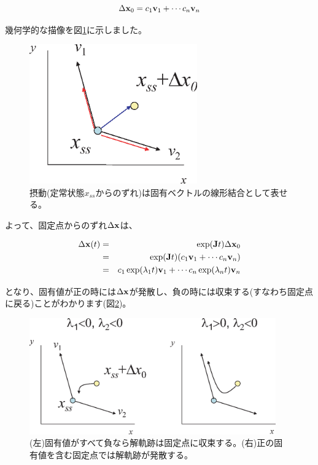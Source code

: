 \[\Delta {\bf x}_0 = c_1 {\bf v}_1 + \cdots c_n {\bf v}_n \]

幾何学的な描像を図\ref{fig:06sysbio}に示しました。

\begin{figure}[ht]
        \centering \includegraphics[height=6cm]{../Bifurcation/img/decomposition.eps}
        \caption{摂動(定常状態\(x_{ss}\)からのずれ)は固有ベクトルの線形結合として表せる。}
        \label{fig:06sysbio} \end{figure}


よって、固定点からのずれ\(\Delta {\bf x}\)は、

\begin{eqnarray*}
\Delta {\bf x}(t) & = & \exp({\bf J}t)\Delta {\bf x}_0\\
                 & = & \exp({\bf J}t)(c_1 {\bf v}_1 + \cdots c_n {\bf v}_n) \\
                 & = & c_1 \exp(\lambda_1 t){\bf v}_1 + \cdots c_n \exp(\lambda_n t){\bf v}_n \\
\end{eqnarray*}

となり、固有値が正の時には\(\Delta {\bf x}\)が発散し、負の時には収束する(すなわち固定点に戻る)ことがわかります(図\ref{fig:07sysbio})。

\begin{figure}[ht]
        \centering \includegraphics[height=5cm]{../Bifurcation/img/eigenvector.eps}
        \caption{(左)固有値がすべて負なら解軌跡は固定点に収束する。(右)正の固有値を含む固定点では解軌跡が発散する。}
        \label{fig:07sysbio} \end{figure}


